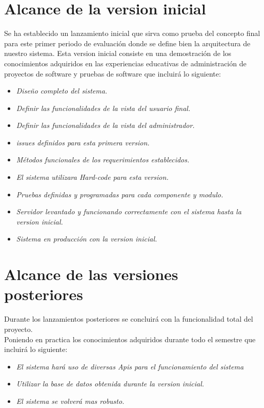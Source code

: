 \documentclass[12pt,a4paper]{book}
\begin{document}
\section{Alcance de la version inicial}
\vspace{0.5 cm}
Se ha establecido un lanzamiento inicial que sirva como prueba del concepto final para este primer periodo de evaluación donde se define bien la arquitectura de nuestro sistema.
Esta version inicial consiste en una demostración de los conocimientos adquiridos en las experiencias educativas de administración de proyectos de software y pruebas de software que incluirá lo siguiente: \\
\vspace{0.5 cm}
\begin{itemize}
\item \textit{Diseño completo del sistema.}
\item \textit{Definir las funcionalidades de la vista del usuario final.}
\item \textit{Definir las funcionalidades de la vista del administrador.}
\item \textit{issues definidos para esta primera version.}
\item \textit{Métodos funcionales de los requerimientos establecidos.}
\item \textit{El sistema utilizara Hard-code para esta version.}
\item \textit{Pruebas definidas y programadas para cada componente y modulo.}
\item \textit{Servidor levantado y funcionando correctamente con el sistema hasta la version inicial.}
\item \textit{Sistema en producción con la version inicial.}
\end{itemize} 
\newpage
\section{Alcance de las versiones posteriores}
\vspace{0.5 cm}
Durante los lanzamientos posteriores se concluirá con la funcionalidad total del proyecto.\\
Poniendo en practica los conocimientos adquiridos durante todo el semestre que incluirá lo siguiente: \\
\begin{itemize}
\item \textit{El sistema hará uso de diversas Apis para el funcionamiento del sistema}
\item \textit{Utilizar la base de datos obtenida durante la version inicial.}
\item \textit{El sistema se volverá mas robusto.}
\end{itemize} 
\newpage
\end{document}

